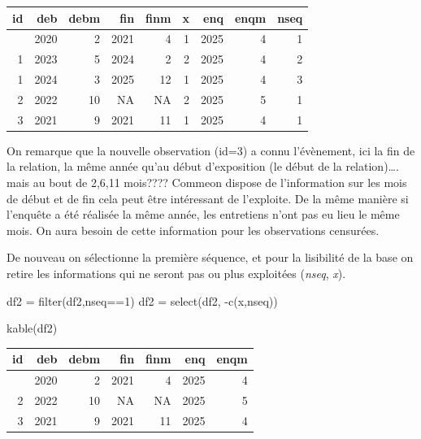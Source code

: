 \documentclass[
  12pt,
  letterpaper,
  DIV=11,
  numbers=noendperiod,
  onepage,
  openany]{scrreprt}
\newenvironment{Shaded}{\begin{snugshade}}{\end{snugshade}}
\newcommand{\DecValTok}[1]{\textcolor[rgb]{0.86,0.86,0.80}{#1}}
\newcommand{\FunctionTok}[1]{\textcolor[rgb]{0.94,0.94,0.56}{#1}}
\newcommand{\NormalTok}[1]{\textcolor[rgb]{0.80,0.80,0.80}{#1}}
\newcommand{\OtherTok}[1]{\textcolor[rgb]{0.94,0.94,0.56}{#1}}
\newcommand{\SpecialCharTok}[1]{\textcolor[rgb]{0.86,0.64,0.64}{#1}}
\begin{document}
\begin{longtable}[]{@{}rrrrrrrrr@{}}
\toprule\noalign{}
id & deb & debm & fin & finm & x & enq & enqm & nseq \\
\midrule\noalign{}
\endhead
\bottomrule\noalign{}
\endlastfoot
1 & 2020 & 2 & 2021 & 4 & 1 & 2025 & 4 & 1 \\
1 & 2023 & 5 & 2024 & 2 & 2 & 2025 & 4 & 2 \\
1 & 2024 & 3 & 2025 & 12 & 1 & 2025 & 4 & 3 \\
2 & 2022 & 10 & NA & NA & 2 & 2025 & 5 & 1 \\
3 & 2021 & 9 & 2021 & 11 & 1 & 2025 & 4 & 1 \\
\end{longtable}

On remarque que la nouvelle observation (id=3) a connu l'évènement, ici
la fin de la relation, la même année qu'au début d'exposition (le début
de la relation)\ldots. mais au bout de 2,6,11 mois???? Commeon dispose
de l'information sur les mois de début et de fin cela peut être
intéressant de l'exploite. De la même manière si l'enquête a été
réalisée la même année, les entretiens n'ont pas eu lieu le même mois.
On aura besoin de cette information pour les observations censurées.

De nouveau on sélectionne la première séquence, et pour la lisibilité de
la base on retire les informations qui ne seront pas ou plus exploitées
(\emph{nseq}, \emph{x}).

\begin{Shaded}
\begin{Highlighting}[]
\NormalTok{df2 }\OtherTok{=} \FunctionTok{filter}\NormalTok{(df2,nseq}\SpecialCharTok{==}\DecValTok{1}\NormalTok{)}
\NormalTok{df2 }\OtherTok{=} \FunctionTok{select}\NormalTok{(df2, }\SpecialCharTok{{-}}\FunctionTok{c}\NormalTok{(x,nseq))}

\FunctionTok{kable}\NormalTok{(df2)}
\end{Highlighting}
\end{Shaded}

\begin{longtable}[]{@{}rrrrrrr@{}}
\toprule\noalign{}
id & deb & debm & fin & finm & enq & enqm \\
\midrule\noalign{}
\endhead
\bottomrule\noalign{}
\endlastfoot
1 & 2020 & 2 & 2021 & 4 & 2025 & 4 \\
2 & 2022 & 10 & NA & NA & 2025 & 5 \\
3 & 2021 & 9 & 2021 & 11 & 2025 & 4 \\
\end{longtable}
\end{document}
